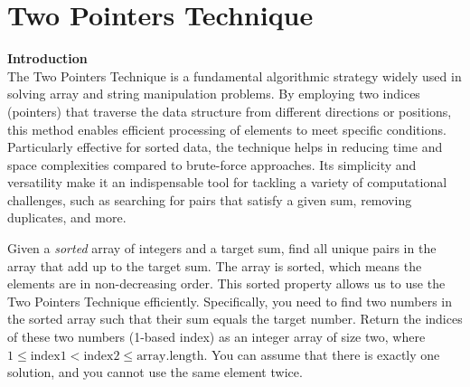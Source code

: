 
\section{Two Pointers Technique}
\label{sec:two-pointers-technique}

\textbf{Introduction} \\
The Two Pointers Technique is a fundamental algorithmic strategy widely used in solving array and string manipulation problems. By employing two indices (pointers) that traverse the data structure from different directions or positions, this method enables efficient processing of elements to meet specific conditions. Particularly effective for sorted data, the technique helps in reducing time and space complexities compared to brute-force approaches. Its simplicity and versatility make it an indispensable tool for tackling a variety of computational challenges, such as searching for pairs that satisfy a given sum, removing duplicates, and more.

Given a \textit{sorted} array of integers and a target sum, find all unique pairs in the array that add up to the target sum. The array is sorted, which means the elements are in non-decreasing order. This sorted property allows us to use the Two Pointers Technique efficiently.
Specifically, you need to find two numbers in the sorted array such that their sum equals the target number. Return the indices of these two numbers (1-based index) as an integer array of size two, where \(1 \leq \text{index1} < \text{index2} \leq \text{array.length}\). You can assume that there is exactly one solution, and you cannot use the same element twice.

